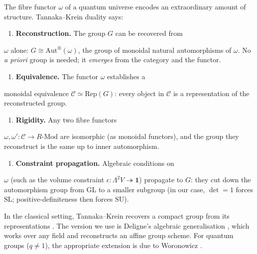 \begin{remark}
  \label{rem:tannaka-krein-overview}
The fibre functor $\omega$ of a quantum universe encodes an extraordinary
amount of structure. Tannaka--Krein duality \cite{deligne1990} says:

\begin{enumerate}
  \item \textbf{Reconstruction.} The group $G$ can be recovered from
\end{enumerate}
   $\omega$ alone:
   $G \cong \mathrm{Aut}^{\otimes}(\omega)$,
   the group of monoidal natural automorphisms of $\omega$.
   No \emph{a priori} group is needed; it \emph{emerges} from the
   category and the functor.
\begin{enumerate}
  \item \textbf{Equivalence.} The functor $\omega$ establishes a
\end{enumerate}
   monoidal equivalence
   $\mathcal{C} \simeq \mathrm{Rep}(G)$:
   every object in $\mathcal{C}$ is a representation of the
   reconstructed group.
\begin{enumerate}
  \item \textbf{Rigidity.} Any two fibre functors
\end{enumerate}
   $\omega, \omega' \colon \mathcal{C} \to R\text{-}\mathrm{Mod}$
   are isomorphic (as monoidal functors), and the group they
   reconstruct is the same up to inner automorphism.
\begin{enumerate}
  \item \textbf{Constraint propagation.} Algebraic conditions on
\end{enumerate}
   $\omega$ (such as the volume constraint
   $\epsilon \colon \Lambda^2 V \twoheadrightarrow \mathbf{1}$)
   propagate to $G$: they cut down the automorphism group from
   $\mathrm{GL}$ to a smaller subgroup (in our case, $\det = 1$
   forces $\mathrm{SL}$; positive-definiteness then forces $\mathrm{SU}$).

In the classical setting, Tannaka--Krein recovers a compact group from
its representations \cite{tannaka1939}. The version we use is
Deligne's algebraic generalisation \cite{deligne1990}, which works
over any field and reconstructs an affine group scheme. For quantum
groups ($q \neq 1$), the appropriate extension is due to
Woronowicz \cite{woronowicz1988}.
\end{remark}

